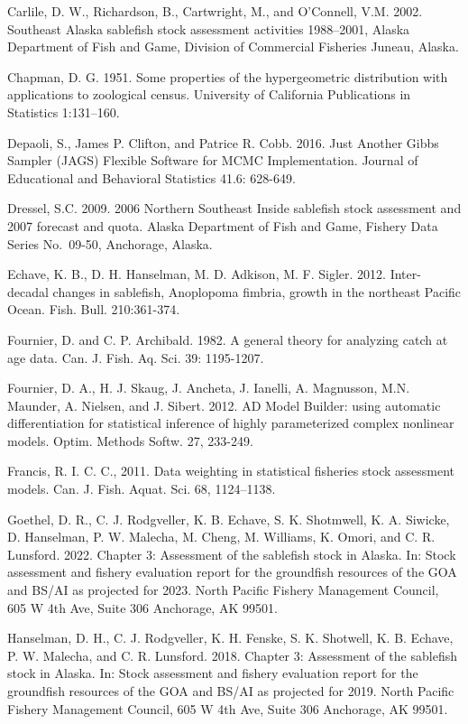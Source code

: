 \documentclass[
]{article}
\begin{document}
Carlile, D. W., Richardson, B., Cartwright, M., and O'Connell, V.M.
2002. Southeast Alaska sablefish stock assessment activities 1988--2001,
Alaska Department of Fish and Game, Division of Commercial Fisheries
Juneau, Alaska.

Chapman, D. G. 1951. Some properties of the hypergeometric distribution
with applications to zoological census. University of California
Publications in Statistics 1:131--160.

Depaoli, S., James P. Clifton, and Patrice R. Cobb. 2016. Just Another
Gibbs Sampler (JAGS) Flexible Software for MCMC Implementation. Journal
of Educational and Behavioral Statistics 41.6: 628-649.

Dressel, S.C. 2009. 2006 Northern Southeast Inside sablefish stock
assessment and 2007 forecast and quota. Alaska Department of Fish and
Game, Fishery Data Series No.~09-50, Anchorage, Alaska.

Echave, K. B., D. H. Hanselman, M. D. Adkison, M. F. Sigler. 2012.
Inter-decadal changes in sablefish, Anoplopoma fimbria, growth in the
northeast Pacific Ocean. Fish. Bull. 210:361-374.

Fournier, D. and C. P. Archibald. 1982. A general theory for analyzing
catch at age data. Can. J. Fish. Aq. Sci. 39: 1195-1207.

Fournier, D. A., H. J. Skaug, J. Ancheta, J. Ianelli, A. Magnusson, M.N.
Maunder, A. Nielsen, and J. Sibert. 2012. AD Model Builder: using
automatic differentiation for statistical inference of highly
parameterized complex nonlinear models. Optim. Methods Softw. 27,
233-249.

Francis, R. I. C. C., 2011. Data weighting in statistical fisheries
stock assessment models. Can. J. Fish. Aquat. Sci. 68, 1124--1138.

Goethel, D. R., C. J. Rodgveller, K. B. Echave, S. K. Shotmwell, K. A.
Siwicke, D. Hanselman, P. W. Malecha, M. Cheng, M. Williams, K. Omori,
and C. R. Lunsford. 2022. Chapter 3: Assessment of the sablefish stock
in Alaska. In: Stock assessment and fishery evaluation report for the
groundfish resources of the GOA and BS/AI as projected for 2023. North
Pacific Fishery Management Council, 605 W 4th Ave, Suite 306 Anchorage,
AK 99501.

Hanselman, D. H., C. J. Rodgveller, K. H. Fenske, S. K. Shotwell, K. B.
Echave, P. W. Malecha, and C. R. Lunsford. 2018. Chapter 3: Assessment
of the sablefish stock in Alaska. In: Stock assessment and fishery
evaluation report for the groundfish resources of the GOA and BS/AI as
projected for 2019. North Pacific Fishery Management Council, 605 W 4th
Ave, Suite 306 Anchorage, AK 99501.
\end{document}
